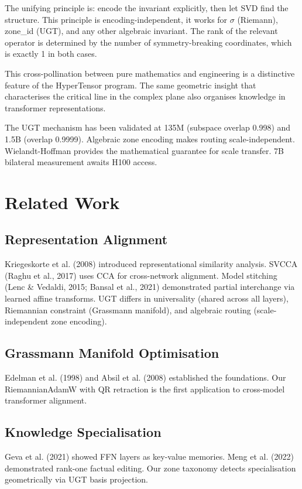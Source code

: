 \documentclass[11pt]{article}
\begin{document}
The unifying principle is: encode the invariant explicitly, then let SVD find the structure. This principle is encoding-independent, it works for $\sigma$ (Riemann), zone\_id (UGT), and any other algebraic invariant. The rank of the relevant operator is determined by the number of symmetry-breaking coordinates, which is exactly 1 in both cases.

This cross-pollination between pure mathematics and engineering is a distinctive feature of the HyperTensor program. The same geometric insight that characterises the critical line in the complex plane also organises knowledge in transformer representations.

The UGT mechanism has been validated at 135M (subspace overlap 0.998) and 1.5B (overlap 0.9999). Algebraic zone encoding makes routing scale-independent. Wielandt-Hoffman provides the mathematical guarantee for scale transfer. 7B bilateral measurement awaits H100 access.


\section{Related Work}

\subsection{Representation Alignment}
Kriegeskorte et al. (2008) introduced representational similarity analysis. SVCCA (Raghu et al., 2017) uses CCA for cross-network alignment. Model stitching (Lenc \& Vedaldi, 2015; Bansal et al., 2021) demonstrated partial interchange via learned affine transforms. UGT differs in universality (shared across all layers), Riemannian constraint (Grassmann manifold), and algebraic routing (scale-independent zone encoding).

\subsection{Grassmann Manifold Optimisation}
Edelman et al. (1998) and Absil et al. (2008) established the foundations. Our RiemannianAdamW with QR retraction is the first application to cross-model transformer alignment.

\subsection{Knowledge Specialisation}
Geva et al. (2021) showed FFN layers as key-value memories. Meng et al. (2022) demonstrated rank-one factual editing. Our zone taxonomy detects specialisation geometrically via UGT basis projection.
\end{document}
